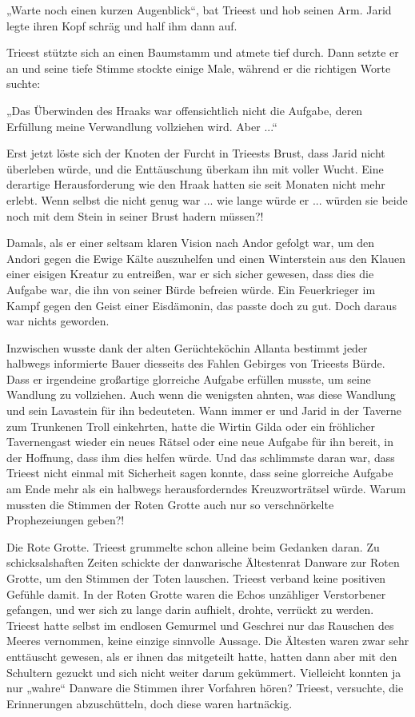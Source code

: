 „Warte noch einen kurzen Augenblick“, bat Trieest und hob seinen Arm. Jarid legte ihren Kopf schräg und half ihm dann auf.

Trieest stützte sich an einen Baumstamm und atmete tief durch. Dann setzte er an und seine tiefe Stimme stockte einige Male, während er die richtigen Worte suchte:

„Das Überwinden des Hraaks war offensichtlich nicht die Aufgabe, deren Erfüllung meine Verwandlung vollziehen wird. Aber ...“

Erst jetzt löste sich der Knoten der Furcht in Trieests Brust, dass Jarid nicht überleben würde, und die Enttäuschung überkam ihn mit voller Wucht. Eine derartige Herausforderung wie den Hraak hatten sie seit Monaten nicht mehr erlebt. Wenn selbst die nicht genug war ... wie lange würde er ... würden sie beide noch mit dem Stein in seiner Brust hadern müssen?!

Damals, als er einer seltsam klaren Vision nach Andor gefolgt war, um den Andori gegen die Ewige Kälte auszuhelfen und einen Winterstein aus den Klauen einer eisigen Kreatur zu entreißen, war er sich sicher gewesen, dass dies die Aufgabe war, die ihn von seiner Bürde befreien würde. Ein Feuerkrieger im Kampf gegen den Geist einer Eisdämonin, das passte doch zu gut. Doch daraus war nichts geworden.

Inzwischen wusste dank der alten Gerüchteköchin Allanta bestimmt jeder halbwegs informierte Bauer diesseits des Fahlen Gebirges von Trieests Bürde. Dass er irgendeine großartige glorreiche Aufgabe erfüllen musste, um seine Wandlung zu vollziehen. Auch wenn die wenigsten ahnten, was diese Wandlung und sein Lavastein für ihn bedeuteten. Wann immer er und Jarid in der Taverne zum Trunkenen Troll einkehrten, hatte die Wirtin Gilda oder ein fröhlicher Tavernengast wieder ein neues Rätsel oder eine neue Aufgabe für ihn bereit, in der Hoffnung, dass ihm dies helfen würde. Und das schlimmste daran war, dass Trieest nicht einmal mit Sicherheit sagen konnte, dass seine glorreiche Aufgabe am Ende mehr als ein halbwegs herausforderndes Kreuzworträtsel würde. Warum mussten die Stimmen der Roten Grotte auch nur so verschnörkelte Prophezeiungen geben?!

Die Rote Grotte. Trieest grummelte schon alleine beim Gedanken daran. Zu schicksalshaften Zeiten schickte der danwarische Ältestenrat Danware zur Roten Grotte, um den Stimmen der Toten lauschen. Trieest verband keine positiven Gefühle damit. In der Roten Grotte waren die Echos unzähliger Verstorbener gefangen, und wer sich zu lange darin aufhielt, drohte, verrückt zu werden. Trieest hatte selbst im endlosen Gemurmel und Geschrei nur das Rauschen des Meeres vernommen, keine einzige sinnvolle Aussage. Die Ältesten waren zwar sehr enttäuscht gewesen, als er ihnen das mitgeteilt hatte, hatten dann aber mit den Schultern gezuckt und sich nicht weiter darum gekümmert. Vielleicht konnten ja nur „wahre“ Danware die Stimmen ihrer Vorfahren hören? Trieest, versuchte, die Erinnerungen abzuschütteln, doch diese waren hartnäckig.

